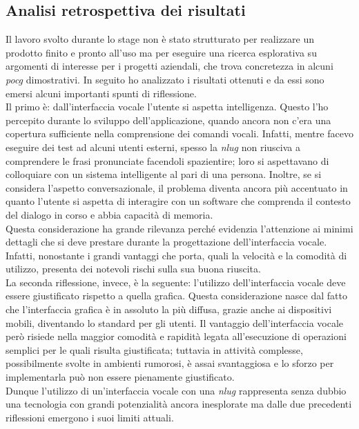 \subsection{Analisi retrospettiva dei risultati}
Il lavoro svolto durante lo stage non è stato strutturato per realizzare un prodotto finito e pronto all'uso ma per eseguire una ricerca esplorativa su argomenti di interesse per i progetti aziendali, che trova concretezza in alcuni \emph{\gls{pocg}} dimostrativi. In seguito ho analizzato i risultati ottenuti e da essi sono emersi alcuni importanti spunti di riflessione. \\
Il primo è: dall'interfaccia vocale l'utente si aspetta intelligenza. Questo l'ho percepito durante lo sviluppo dell'applicazione, quando ancora non c'era una copertura sufficiente nella comprensione dei comandi vocali. Infatti, mentre facevo eseguire dei test ad alcuni utenti esterni, spesso la \emph{\gls{nlug}} non riusciva a comprendere le frasi pronunciate facendoli spazientire; loro si aspettavano di colloquiare con un sistema intelligente al pari di una persona. Inoltre, se si considera l'aspetto conversazionale, il problema diventa ancora più accentuato in quanto l'utente si aspetta di interagire con un software che comprenda il contesto del dialogo in corso e abbia capacità di memoria. \\
Questa considerazione ha grande rilevanza perché evidenzia l'attenzione ai minimi dettagli che si deve prestare durante la progettazione dell'interfaccia vocale. Infatti, nonostante i grandi vantaggi che porta, quali la velocità e la comodità di utilizzo, presenta dei notevoli rischi sulla sua buona riuscita. \\
La seconda riflessione, invece, è la seguente: l'utilizzo dell'interfaccia vocale deve essere giustificato rispetto a quella grafica. Questa considerazione nasce dal fatto che l'interfaccia grafica è in assoluto la più diffusa, grazie anche ai dispositivi mobili, diventando lo standard per gli utenti. Il vantaggio dell'interfaccia vocale però risiede nella maggior comodità e rapidità legata all'esecuzione di operazioni semplici per le quali risulta giustificata; tuttavia in attività complesse, possibilmente svolte in ambienti rumorosi, è assai svantaggiosa e lo sforzo per implementarla può non essere pienamente giustificato. \\
Dunque l'utilizzo di un'interfaccia vocale con una \emph{\gls{nlug}} rappresenta senza dubbio una tecnologia con grandi potenzialità ancora inesplorate ma dalle due precedenti riflessioni emergono i suoi limiti attuali. \\
